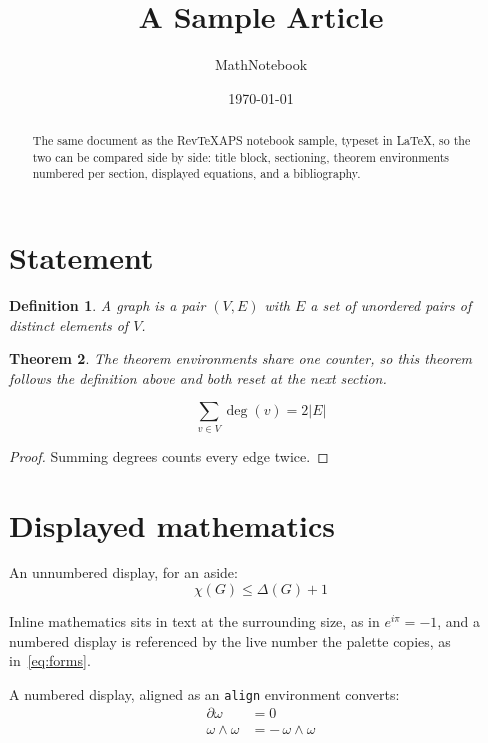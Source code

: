 \documentclass[aps,prd,preprint,amsmath,amssymb]{revtex4-2}
\newtheorem{theorem}{Theorem}[section]
\newtheorem{definition}[theorem]{Definition}
\theoremstyle{remark}
\begin{document}
\title{A Sample Article}
\author{MathNotebook}
\date{\today}

\begin{abstract}
The same document as the RevTeXAPS notebook sample, typeset in LaTeX, so the
two can be compared side by side: title block, sectioning, theorem environments
numbered per section, displayed equations, and a bibliography.
\end{abstract}

\maketitle

\section{Statement}

\begin{definition}
A graph is a pair $(V,E)$ with $E$ a set of unordered pairs of distinct elements of $V$.
\end{definition}

\begin{theorem}
The theorem environments share one counter, so this theorem follows the definition
above and both reset at the next section.
\end{theorem}

\begin{equation}
  \sum_{v \in V} \deg(v) = 2\lvert E \rvert
\end{equation}

\begin{proof}
Summing degrees counts every edge twice.
\end{proof}

\section{Displayed mathematics}

An unnumbered display, for an aside:
\[
  \chi(G) \le \Delta(G) + 1
\]

Inline mathematics sits in text at the surrounding size, as in $e^{i\pi} = -1$, and a
numbered display is referenced by the live number the palette copies, as in~\eqref{eq:forms}.

A numbered display, aligned as an \texttt{align} environment converts:
\begin{align}
  \partial \omega &= 0 \label{eq:forms} \\
  \omega \wedge \omega &= -\, \omega \wedge \omega
\end{align}
\end{document}

